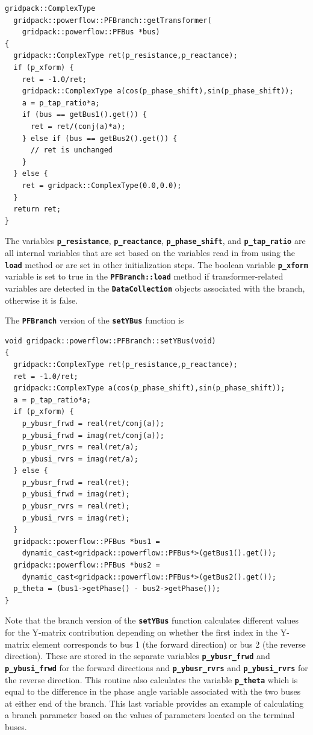 {
\color{red}
\begin{Verbatim}[fontseries=b]
gridpack::ComplexType
  gridpack::powerflow::PFBranch::getTransformer(
    gridpack::powerflow::PFBus *bus)
{
  gridpack::ComplexType ret(p_resistance,p_reactance);
  if (p_xform) {
    ret = -1.0/ret;
    gridpack::ComplexType a(cos(p_phase_shift),sin(p_phase_shift));
    a = p_tap_ratio*a;
    if (bus == getBus1().get()) {
      ret = ret/(conj(a)*a);
    } else if (bus == getBus2().get()) {
      // ret is unchanged
    }
  } else {
    ret = gridpack::ComplexType(0.0,0.0);
  }
  return ret;
}
\end{Verbatim}
}

The variables \texttt{\textbf{p\_resistance}}, \texttt{\textbf{p\_reactance}}, \texttt{\textbf{p\_phase\_shift}}, and \texttt{\textbf{p\_tap\_ratio}} are all internal variables that are set based on the variables read in from using the \texttt{\textbf{load}} method or are set in other initialization steps. The boolean variable \texttt{\textbf{p\_xform}} variable is set to true in the \texttt{\textbf{PFBranch::load}} method if transformer-related variables are detected in the \texttt{\textbf{DataCollection}} objects associated with the branch, otherwise it is false.

The \texttt{\textbf{PFBranch}} version of the \texttt{\textbf{setYBus}} function is

{
\color{red}
\begin{Verbatim}[fontseries=b]
void gridpack::powerflow::PFBranch::setYBus(void)
{
  gridpack::ComplexType ret(p_resistance,p_reactance);
  ret = -1.0/ret;
  gridpack::ComplexType a(cos(p_phase_shift),sin(p_phase_shift));
  a = p_tap_ratio*a;
  if (p_xform) {
    p_ybusr_frwd = real(ret/conj(a));
    p_ybusi_frwd = imag(ret/conj(a));
    p_ybusr_rvrs = real(ret/a);
    p_ybusi_rvrs = imag(ret/a);
  } else {
    p_ybusr_frwd = real(ret);
    p_ybusi_frwd = imag(ret);
    p_ybusr_rvrs = real(ret);
    p_ybusi_rvrs = imag(ret);
  }
  gridpack::powerflow::PFBus *bus1 =
    dynamic_cast<gridpack::powerflow::PFBus*>(getBus1().get());
  gridpack::powerflow::PFBus *bus2 =
    dynamic_cast<gridpack::powerflow::PFBus*>(getBus2().get());
  p_theta = (bus1->getPhase() - bus2->getPhase());
}
\end{Verbatim}
}

Note that the branch version of the \texttt{\textbf{setYBus}} function calculates different values for the Y-matrix contribution depending on whether the first index in the Y-matrix element corresponds to bus 1 (the forward direction) or bus 2 (the reverse direction). These are stored in the separate variables \texttt{\textbf{p\_ybusr\_frwd}} and \texttt{\textbf{p\_ybusi\_frwd}} for the forward directions and \texttt{\textbf{p\_ybusr\_rvrs}} and \texttt{\textbf{p\_ybusi\_rvrs}} for the reverse direction. This routine also calculates the variable \texttt{\textbf{p\_theta}} which is equal to the difference in the phase angle variable associated with the two buses at either end of the branch. This last variable provides an example of calculating a branch parameter based on the values of parameters located on the terminal buses.

